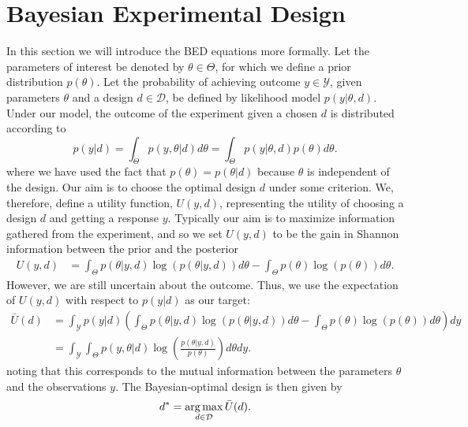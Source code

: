 
\section{Bayesian Experimental Design}
\label{sec:design:bed}

In this section we will introduce the BED equations more formally.
Let the parameters of interest be denoted by $\theta \in \Theta$, for which we define a prior distribution $p(\theta)$.
Let the probability of achieving outcome $y\in\mathcal{Y}$, given parameters $\theta$ 
and a design $d \in \mathcal{D}$, be defined by likelihood model $p(y | \theta, d)$.
Under our model, the outcome of the experiment given a chosen $d$ is distributed according to
\begin{equation}
\label{eq:marginal_def}
p(y | d) = \int_{\Theta} p(y,\theta | d) d\theta = \int_{\Theta} p(y | \theta, d) p(\theta) d\theta.
\end{equation}
where we have used the fact that $p(\theta)=p(\theta|d)$ because $\theta$ is independent of the design.
Our aim is to choose the optimal design $d$ under some criterion. 
We, therefore, define a utility function, $U(y,d)$, representing the utility of choosing a design $d$ 
and getting a response $y$.
Typically our aim is to maximize information gathered from the experiment, and so we set 
$U(y,d)$ to be the gain in Shannon information between the prior and the posterior
\begin{align}
\label{eq:shannon_inf}
U(y,d) &= \int_{\Theta} p(\theta |y, d) \log(p(\theta |y, d)) d\theta -\int_{\Theta} p(\theta) \log(p(\theta))d\theta.
\end{align}
However, we are still uncertain about the outcome. Thus, we use the expectation of $U(y,d)$ with respect to $p(y | d)$
as our target:
\begin{align}
\bar{U}(d) 
&=\int_{\mathcal{Y}} p(y|d) \left(
\int_{\Theta} p(\theta | y, d)\log(p(\theta |y, d)) d\theta - 
\int_{\Theta} p(\theta) \log(p(\theta)) d\theta \right) dy \nonumber\\
&=\int_{\mathcal{Y}}\int_{\Theta} p(y,\theta | d)\log\left(\frac{p(\theta |y, d)}{p(\theta)}\right)d\theta dy. 
\label{eq:u_bar_1}
\end{align}
noting that this corresponds to the mutual information between the parameters $\theta$ and
the observations $y$.  The Bayesian-optimal design is then given by
\begin{equation}
\label{eq:d_star}
d^* = \operatorname*{arg\,max}_{d \in \mathcal{D}} \bar{U}(d).
\end{equation}


